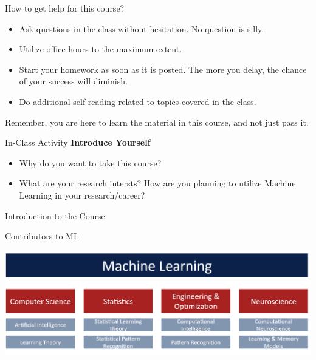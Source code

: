 \documentclass[aspectratio=169,xcolor=dvipsnames,svgnames,x11names,fleqn]{beamer}
\begin{document}
\begin{frame}{How to get help for this course?}
\begin{itemize}
    \item Ask questions in the class without hesitation. No question is silly.
    \item Utilize office hours to the maximum extent.
    \item Start your homework as soon as it is posted. The more you delay, the chance of your success will diminish.
    \item Do additional self-reading related to topics covered in the class.
\end{itemize}

\begin{texample}
Remember, you are here to learn the material in this course, and not just pass it.
\end{texample}
\end{frame}

\begin{frame}{In-Class Activity}
  \centering
  \textbf{Introduce Yourself} \\[1em]
  
  \begin{block}{}
    \begin{itemize}
      \item Why do you want to take this course?
      \item What are your research intersts? How are you planning to utilize Machine Learning in your research/career?
    \end{itemize}
  \end{block}

\end{frame}

\begin{sectionframe}{\faRocket}{Introduction to the Course}
\end{sectionframe}


\begin{frame}{Contributors to ML}
\begin{center}
\includegraphics[width=.9\textwidth]{figures/intro-ml}
\end{center}
\end{frame}
\end{document}
